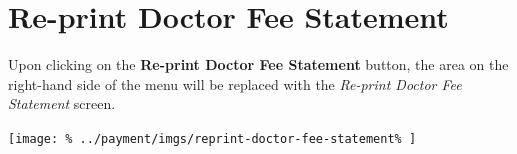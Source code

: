 \documentclass[../main/main]{subfiles}
\begin{document}
\newpage
\section{Re-print Doctor Fee Statement}
\label{sec:re-print-doctor-fee-statement}

Upon clicking on the \textbf{Re-print Doctor Fee Statement} button,
the area on the right-hand side of the menu will be replaced with the
\emph{Re-print Doctor Fee Statement} screen.

\texttt{[image: \%
  ../payment/imgs/reprint-doctor-fee-statement\%
]}
\end{document}

